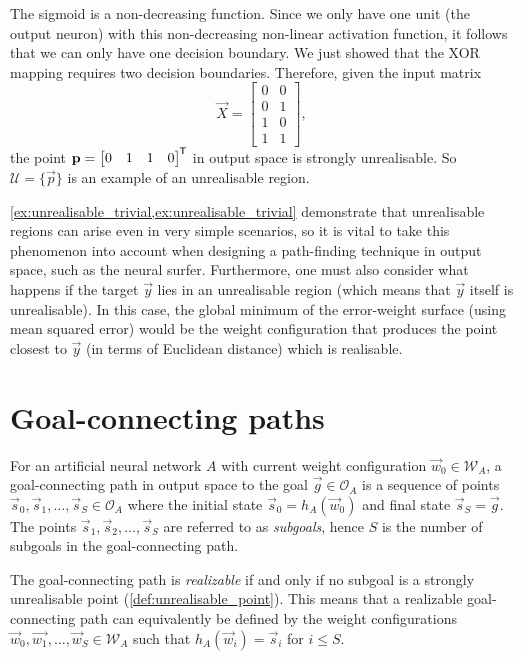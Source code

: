 \begin{example}
    The sigmoid is a non-decreasing function.
    Since we only have one unit (the output neuron) with this non-decreasing non-linear activation function, it follows that we can only have one decision boundary.
    We just showed that the XOR mapping requires two decision boundaries.
    Therefore, given the input matrix
    \begin{equation*}
        \vec{X} = \begin{bmatrix}
            0 & 0 \\
            0 & 1 \\
            1 & 0 \\
            1 & 1
        \end{bmatrix},
    \end{equation*}
    the point
    $
        \mathbf{p} = \begin{bmatrix}
            0 & 1 & 1 & 0
        \end{bmatrix}^{\mkern-1.5mu\mathsf{T}}
    $
    in output space is strongly unrealisable.
    So $\mathcal{U} = \{\vec{p}\}$ is an example of an unrealisable region.    
\end{example}

\begin{remark}
    \ref{ex:unrealisable_trivial,ex:unrealisable_trivial} demonstrate that unrealisable regions can arise even in very simple scenarios, so it is vital to take this phenomenon into account when designing a path-finding technique in output space, such as the neural surfer.
    Furthermore, one must also consider what happens if the target $\vec{y}$ lies in an unrealisable region (which means that $\vec{y}$ itself is unrealisable).
    In this case, the global minimum of the error-weight surface (using mean squared error) would be the weight configuration that produces the point closest to $\vec{y}$ (in terms of Euclidean distance) which is realisable.
\end{remark}

\section{Goal-connecting paths}
\begin{definition}
    \label{def:goal_connecting_path}
    For an artificial neural network $A$ with current weight configuration $\vec{w}_0 \in \mathcal{W}_A$, a goal-connecting path in output space to the goal $\vec{g}\in \mathcal{O}_A$ is a sequence of points $\vec{s}_0, \vec{s}_1,\dots,\vec{s}_{S} \in \mathcal{O}_A$ where the initial state $\vec{s}_0 = h_A(\vec{w}_0)$ and final state $\vec{s}_S=\vec{g}$.
    The points $\vec{s}_1,\vec{s}_2,\dots,\vec{s}_S$ are referred to as \textit{subgoals}, hence $S$ is the number of subgoals in the goal-connecting path. 

    The goal-connecting path is \textit{realizable} if and only if no subgoal is a strongly unrealisable point (\ref{def:unrealisable_point}).
    This means that a realizable goal-connecting path can equivalently be defined by the weight configurations $\vec{w}_0, \vec{w_1},\dots,\vec{w}_S \in \mathcal{W}_A$ such that $h_A(\vec{w}_i) = \vec{s}_i$ for $i \leq S$.
\end{definition}

